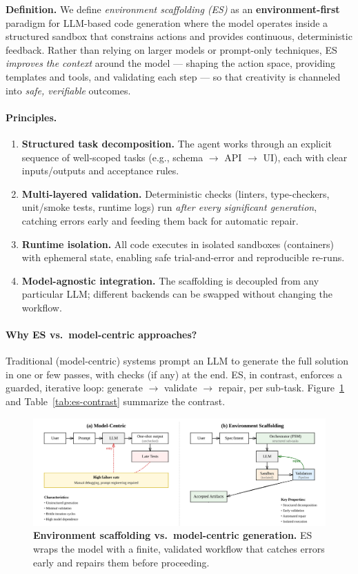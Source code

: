 \documentclass[conference]{IEEEtran}
\begin{document}
\textbf{Definition.} We define \emph{environment scaffolding (ES)} as an \textbf{environment-first} paradigm for LLM-based code generation where the model operates inside a structured sandbox that constrains actions and provides continuous, deterministic feedback. Rather than relying on larger models or prompt-only techniques, ES \emph{improves the context} around the model --- shaping the action space, providing templates and tools, and validating each step --- so that creativity is channeled into \emph{safe, verifiable} outcomes.

\paragraph{Principles.}
\begin{enumerate}
  \item \textbf{Structured task decomposition.} The agent works through an explicit sequence of well-scoped tasks (e.g., schema $\rightarrow$ API $\rightarrow$ UI), each with clear inputs/outputs and acceptance rules.
  \item \textbf{Multi-layered validation.} Deterministic checks (linters, type-checkers, unit/smoke tests, runtime logs) run \emph{after every significant generation}, catching errors early and feeding them back for automatic repair.
  \item \textbf{Runtime isolation.} All code executes in isolated sandboxes (containers) with ephemeral state, enabling safe trial-and-error and reproducible re-runs.
  \item \textbf{Model-agnostic integration.} The scaffolding is decoupled from any particular LLM; different backends can be swapped without changing the workflow.
\end{enumerate}

\paragraph{Why ES vs.\ model-centric approaches?}
Traditional (model-centric) systems prompt an LLM to generate the full solution in one or few passes, with checks (if any) at the end. ES, in contrast, enforces a guarded, iterative loop: generate $\rightarrow$ validate $\rightarrow$ repair, per sub-task. Figure~\ref{fig:es-vs-model} and Table~\ref{tab:es-contrast} summarize the contrast.

\begin{figure}[t]
  \centering
  \includegraphics[width=\linewidth]{diagrams/es-vs-model.png}
  \caption{\textbf{Environment scaffolding vs.\ model-centric generation.} ES wraps the model with a finite, validated workflow that catches errors early and repairs them before proceeding.}
  \label{fig:es-vs-model}
\end{figure}
\end{document}
